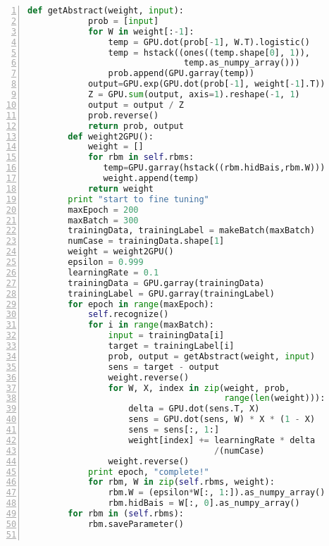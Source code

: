 \begin{lstlisting}[language=Python,numbers=left, frame=shadowbox, rulesepcolor=\color{cadegrey}, caption=\text{DBNs.py}]
        def getAbstract(weight, input):
            prob = [input]
            for W in weight[:-1]:
                temp = GPU.dot(prob[-1], W.T).logistic()
                temp = hstack((ones((temp.shape[0], 1)), 
                               temp.as_numpy_array()))
                prob.append(GPU.garray(temp))
            output=GPU.exp(GPU.dot(prob[-1], weight[-1].T))
            Z = GPU.sum(output, axis=1).reshape(-1, 1)
            output = output / Z
            prob.reverse()
            return prob, output            
        def weight2GPU():
            weight = []
            for rbm in self.rbms:
               temp=GPU.garray(hstack((rbm.hidBais,rbm.W)))
               weight.append(temp)
            return weight     
        print "start to fine tuning"
        maxEpoch = 200
        maxBatch = 300
        trainingData, trainingLabel = makeBatch(maxBatch)
        numCase = trainingData.shape[1]
        weight = weight2GPU()
        epsilon = 0.999
        learningRate = 0.1
        trainingData = GPU.garray(trainingData)
        trainingLabel = GPU.garray(trainingLabel)
        for epoch in range(maxEpoch):         
            self.recognize()
            for i in range(maxBatch):
                input = trainingData[i]
                target = trainingLabel[i]
                prob, output = getAbstract(weight, input)
                sens = target - output                
                weight.reverse()
                for W, X, index in zip(weight, prob, 
                                       range(len(weight))):
                    delta = GPU.dot(sens.T, X)
                    sens = GPU.dot(sens, W) * X * (1 - X)
                    sens = sens[:, 1:]
                    weight[index] += learningRate * delta
                                     /(numCase)                        
                weight.reverse()                    
            print epoch, "complete!"
            for rbm, W in zip(self.rbms, weight):
                rbm.W = (epsilon*W[:, 1:]).as_numpy_array()
                rbm.hidBais = W[:, 0].as_numpy_array()                    
        for rbm in (self.rbms):
            rbm.saveParameter()
    

\end{lstlisting}
